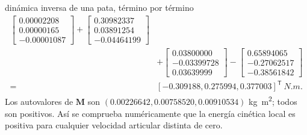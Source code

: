 \documentclass[11pt,letterpaper]{article}
\newcommand{\mat}[1]{\bm{#1}}
\newcommand{\trans}{^{\mathsf T}}
\begin{document}
\begin{workedexample}{dinámica inversa de una pata, término por término}
\begin{align*}
 \begin{bmatrix}0.00002208\\0.00000165\\-0.00001087\end{bmatrix}+
 \begin{bmatrix}0.30982337\\0.03891254\\-0.04464199\end{bmatrix}\\
 &+\begin{bmatrix}0.03800000\\-0.03399728\\0.03639999\end{bmatrix}
 -\begin{bmatrix}0.65894065\\-0.27062517\\-0.38561842\end{bmatrix}\\
 ={}&\boxed{[-0.309188,0.275994,0.377003]\trans\ \si{N.m}}.
\end{align*}
Los autovalores de $\mat M$ son
$(0.00226642,0.00758520,0.00910534)$ \si{kg.m^2}; todos son positivos. Así se
comprueba numéricamente que la energía cinética local es positiva para cualquier
velocidad articular distinta de cero.
\end{workedexample}
\end{document}
